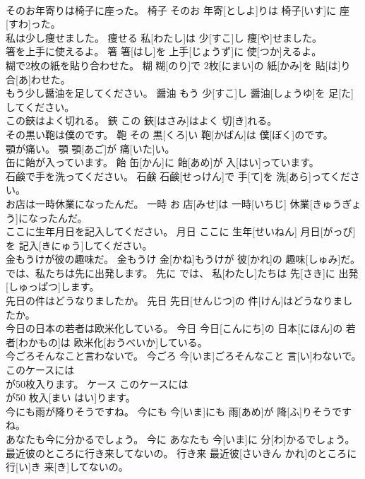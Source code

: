 \documentclass[8pt]{extreport}
\begin{document}
\begin{CJK}{UTF8}{min}
\\	そのお年寄りは椅子に座った。	椅子	そのお 年寄[としよ]りは 椅子[いす]に 座[すわ]った。	
\\	私は少し痩せました。	痩せる	私[わたし]は 少[すこ]し 痩[や]せました。	
\\	箸を上手に使えるよ。	箸	箸[はし]を 上手[じょうず]に 使[つか]えるよ。	
\\	糊で2枚の紙を貼り合わせた。	糊	糊[のり]で 2枚[にまい]の 紙[かみ]を 貼[は]り 合[あ]わせた。	
\\	もう少し醤油を足してください。	醤油	もう 少[すこ]し 醤油[しょうゆ]を 足[た]してください。	
\\	この鋏はよく切れる。	鋏	この 鋏[はさみ]はよく 切[き]れる。	
\\	その黒い鞄は僕のです。	鞄	その 黒[くろ]い 鞄[かばん]は 僕[ぼく]のです。	
\\	顎が痛い。	顎	顎[あご]が 痛[いた]い。	
\\	缶に飴が入っています。	飴	缶[かん]に 飴[あめ]が 入[はい]っています。	
\\	石鹸で手を洗ってください。	石鹸	石鹸[せっけん]で 手[て]を 洗[あら]ってください。	
\\	お店は一時休業になったんだ。	一時	お 店[みせ]は 一時[いちじ] 休業[きゅうぎょう]になったんだ。	
\\	ここに生年月日を記入してください。	月日	ここに 生年[せいねん] 月日[がっぴ]を 記入[きにゅう]してください。	
\\	金もうけが彼の趣味だ。	金もうけ	金[かね]もうけが 彼[かれ]の 趣味[しゅみ]だ。	
\\	では、私たちは先に出発します。	先に	では、 私[わたし]たちは 先[さき]に 出発[しゅっぱつ]します。	
\\	先日の件はどうなりましたか。	先日	先日[せんじつ]の 件[けん]はどうなりましたか。	
\\	今日の日本の若者は欧米化している。	今日	今日[こんにち]の 日本[にほん]の 若者[わかもの]は 欧米化[おうべいか]している。	
\\	今ごろそんなこと言わないで。	今ごろ	今[いま]ごろそんなこと 言[い]わないで。	
\\	このケースには
\\	が50枚入ります。	ケース	このケースには
\\	が50 枚入[まい はい]ります。	
\\	今にも雨が降りそうですね。	今にも	今[いま]にも 雨[あめ]が 降[ふ]りそうですね。	
\\	あなたも今に分かるでしょう。	今に	あなたも 今[いま]に 分[わ]かるでしょう。	
\\	最近彼のところに行き来してないの。	行き来	最近彼[さいきん かれ]のところに 行[い]き 来[き]してないの。	

\end{CJK}
\end{document}
